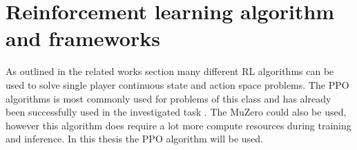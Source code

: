 \section{Reinforcement learning algorithm and frameworks}

As outlined in the related works section many different RL algorithms can be used to solve single player continuous state and action space problems. The PPO algorithms is most commonly used for problems of this class and has already been successfully used in the investigated task \autocite{maximilian}. The MuZero \autocite{alphagoimprovementmuzero} could also be used, however this algorithm does require a lot more compute resources during training and inference.
In this thesis the PPO algorithm will be used.

